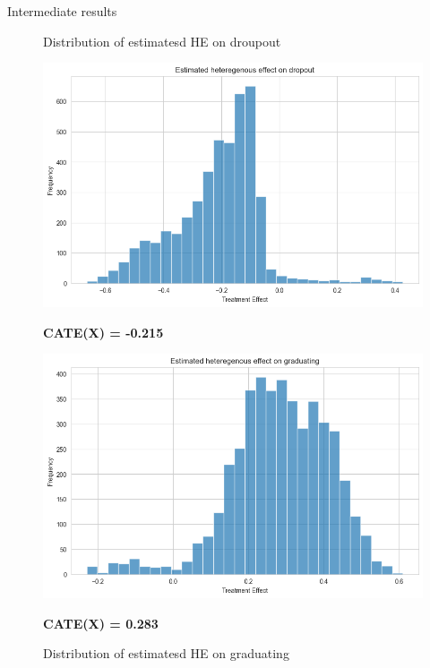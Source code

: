 \documentclass[aspectratio=169]{beamer}
\begin{document}
\begin{frame}{Intermediate results}

\begin{figure}[h!]
    \begin{minipage}[b]{0.45\textwidth}
        
        \caption{Distribution of estimatesd HE on droupout}
        \includegraphics[width=1\linewidth]{Tex_Pictures/Distribution_of_TE_drop_out.png}

       \textbf{ CATE(X) = -0.215}
       
    \end{minipage}
    \hspace{0.05\textwidth}
    \begin{minipage}[b]{0.45\textwidth}
        \caption{Distribution of estimatesd HE on graduating}
        \includegraphics[width=1\linewidth]{Tex_Pictures/Distribution_TE_graduate.png}

         \textbf{ CATE(X) = 0.283}
       
    \end{minipage}
    
 \end{figure}   
\end{frame}
\end{document}
